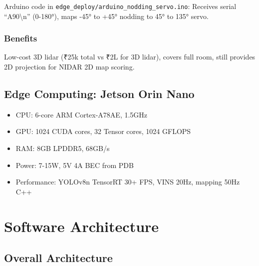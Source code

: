 \documentclass[12pt,a4paper]{article}
\begin{document}
Arduino code in \texttt{edge\_deploy/arduino\_nodding\_servo.ino}: Receives serial ``A90\textbackslash n'' (0-180°), maps -45° to +45° nodding to 45° to 135° servo.

\subsubsection{Benefits}
Low-cost 3D lidar (₹25k total vs ₹2L for 3D lidar), covers full room, still provides 2D projection for NIDAR 2D map scoring.

\subsection{Edge Computing: Jetson Orin Nano}
\begin{itemize}
    \item CPU: 6-core ARM Cortex-A78AE, 1.5GHz
    \item GPU: 1024 CUDA cores, 32 Tensor cores, 1024 GFLOPS
    \item RAM: 8GB LPDDR5, 68GB/s
    \item Power: 7-15W, 5V 4A BEC from PDB
    \item Performance: YOLOv8n TensorRT 30+ FPS, VINS 20Hz, mapping 50Hz C++
\end{itemize}

\section{Software Architecture}

\subsection{Overall Architecture}
\end{document}
